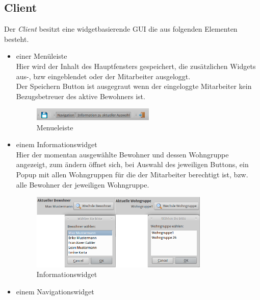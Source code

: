 \subsection{\EBP Client}
Der \EBP \textit{Client} besitzt eine widgetbasierende GUI die aus folgenden Elementen besteht.
\begin{itemize}
	\item einer Menüleiste\mbox{}\\
	\noindent
	Hier wird der Inhalt des Hauptfensters gespeichert, die zusätzlichen Widgets aus-, bzw eingeblendet oder der Mitarbeiter ausgeloggt.\\ Der Speichern Button ist ausgegraut wenn der eingeloggte Mitarbeiter kein Bezugsbetreuer des aktive Bewohners ist.
	\begin{figure}[h]
		\begin{center}
			\includegraphics[keepaspectratio=true, width=0.55\textwidth]{pics/client_header.png}
			\caption{Menueleiste}
		\end{center}
	\end{figure}
	\FloatBarrier
	\noindent
	\item einem Informationswidget\mbox{}\\
	Hier der momentan ausgewählte Bewohner und dessen Wohngruppe angezeigt, zum ändern öffnet sich, bei Auswahl des jeweiligen Buttons, ein Popup mit allen Wohngruppen für die der Mitarbeiter berechtigt ist, bzw. alle Bewohner der jeweiligen Wohngruppe.
	\begin{figure}[h]
		\begin{center}
			\includegraphics[keepaspectratio=true, width=0.8\textwidth]{pics/client_info.png}
			\caption{Informationswidget}
		\end{center}
	\end{figure}
	\FloatBarrier
	\newpage
	\item einem Navigationswidget\mbox{}\\

\end{itemize}
